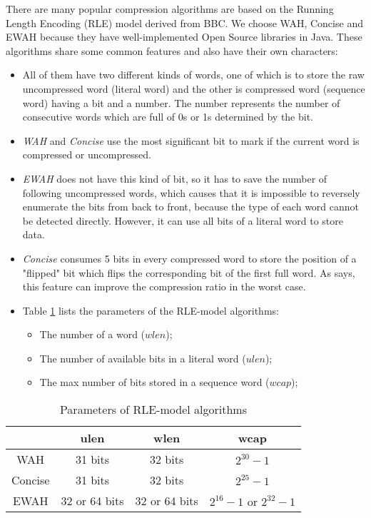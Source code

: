 There are many popular compression algorithms are based on the Running Length Encoding (RLE) model derived from BBC\cite{antoshenkov1995byte}. We choose WAH\cite{wu2006optimizing}, Concise\cite{colantonio2010} and EWAH\cite{lemire2010} because they have well-implemented Open Source libraries in Java. These algorithms share some common features and also have their own characters:
\begin{itemize}
\item All of them have two different kinds of words, one of which is to store the raw uncompressed word (literal word) and the other is compressed word (sequence word) having a bit and a number. The number represents the number of consecutive words which are full of 0s or 1s determined by the bit.
\item \emph{WAH} and \emph{Concise} use the most significant bit to mark if the current word is compressed or uncompressed.
\item \emph{EWAH} does not have this kind of bit, so it has to save the number of following uncompressed words, which causes that it is impossible to reversely enumerate the bits from back to front, because the type of each word cannot be detected directly. However, it can use all bits of a literal word to store data.
\item \emph{Concise} consumes 5 bits in every compressed word to store the position of a "flipped" bit which flips the corresponding bit of the first full word. As \cite{colantonio2010} says, this feature can improve the compression ratio in the worst case.
\item Table \ref{tbl:bmparms} lists the parameters of the RLE-model algorithms:
\begin{itemize}
  \item The number of a word ($wlen$);
  \item The number of available bits in a literal word ($ulen$);
  \item The max number of bits stored in a sequence word ($wcap$);
\end{itemize}
\end{itemize}

\begin{table}[h]
\centering
\begin{tabular}{|c|c|c|c|}
\hline
& ulen & wlen & wcap \\
\hline
WAH & 31 bits & 32 bits & $2^{30} - 1$ \\
\hline
Concise & 31 bits & 32 bits & $2^{25} - 1$ \\
\hline
EWAH & 32 or 64 bits & 32 or 64 bits & $2^{16} - 1 \text{ or } 2^{32} - 1$ \\
\hline
\end{tabular}
\caption{Parameters of RLE-model algorithms}
\label{tbl:bmparms}
\end{table}


